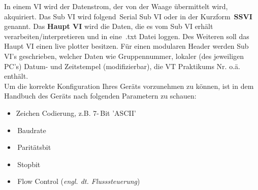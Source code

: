 %


\noindent In einem VI wird der Datenstrom, der von der Waage übermittelt wird, akquiriert. Das Sub VI wird folgend \,{\Menlo Serial Sub VI} oder in der Kurzform \textbf{\,{\Menlo SSVI}} genannt. Das \textbf{Haupt VI} wird die Daten, die es vom Sub VI erhält verarbeiten/interpretieren und in eine \,{\Menlo *.txt} Datei loggen. Des Weiteren soll das Haupt VI einen live plotter besitzen. Für einen modularen Header werden Sub VI's geschrieben, welcher Daten wie Gruppennummer, lokaler (des jeweiligen PC's) Datum- und Zeitstempel (modifizierbar), die VT Praktikums Nr. o.ä. enthält.\\

\noindent Um die korrekte Konfiguration Ihres Geräts vorzunehmen zu können, ist in dem Handbuch des Geräts nach folgenden Parametern zu schauen:

\begin{itemize} %
\singlespacing
\item Zeichen Codierung, z.B. 7-\,{\Menlo Bit} 'ASCII'
\item \,{\Menlo Baudrate}
\item \,{\Menlo Paritätsbit}
\item \,{\Menlo Stopbit}
\item \,{\Menlo Flow Control}  (\textit{engl. dt. Flusssteuerung})
\end{itemize}

